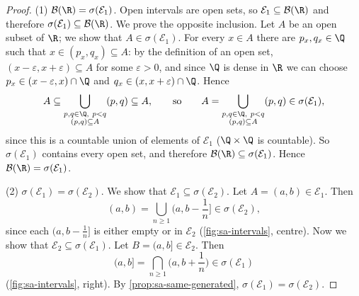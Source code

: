 \begin{proof}
(1) $\mathcal B(\R)=\sigma(\mathcal E_1)$. Open intervals are open sets, so
$\mathcal E_1\subseteq\mathcal B(\R)$ and therefore $\sigma(\mathcal E_1)\subseteq\mathcal B(\R)$.
We prove the opposite inclusion. Let $A$ be an open subset of $\R$; we show that
$A\in\sigma(\mathcal E_1)$. For every $x\in A$ there are $p_x,q_x\in\Q$ such that
$x\in(p_x,q_x)\subseteq A$: by the definition of an open set, $(x-\varepsilon,x+\varepsilon)\subseteq A$
for some $\varepsilon>0$, and since $\Q$ is dense in $\R$ we can choose
$p_x\in(x-\varepsilon,x)\cap\Q$ and $q_x\in(x,x+\varepsilon)\cap\Q$. Hence
\[
  A\subseteq\bigcup_{\substack{p,q\in\Q,\ p<q\\(p,q)\subseteq A}}(p,q)\subseteq A,
  \qquad\text{so}\qquad
  A=\bigcup_{\substack{p,q\in\Q,\ p<q\\(p,q)\subseteq A}}(p,q)\in\sigma(\mathcal E_1),
\]
since this is a countable union of elements of $\mathcal E_1$ ($\Q\times\Q$ is countable).
So $\sigma(\mathcal E_1)$ contains every open set, and therefore
$\mathcal B(\R)\subseteq\sigma(\mathcal E_1)$. Hence $\mathcal B(\R)=\sigma(\mathcal E_1)$.

(2) $\sigma(\mathcal E_1)=\sigma(\mathcal E_2)$. We show that
$\mathcal E_1\subseteq\sigma(\mathcal E_2)$. Let $A=(a,b)\in\mathcal E_1$. Then
\[
  (a,b)=\bigcup_{n\ge1}\Big(a,b-\frac1n\Big]\in\sigma(\mathcal E_2),
\]
since each $(a,b-\frac1n]$ is either empty or in $\mathcal E_2$ (\cref{fig:sa-intervals},
centre). Now we show that $\mathcal E_2\subseteq\sigma(\mathcal E_1)$. Let
$B=(a,b]\in\mathcal E_2$. Then
\[
  (a,b]=\bigcap_{n\ge1}\Big(a,b+\frac1n\Big)\in\sigma(\mathcal E_1)
\]
(\cref{fig:sa-intervals}, right). By \cref{prop:sa-same-generated},
$\sigma(\mathcal E_1)=\sigma(\mathcal E_2)$.


\end{proof}
